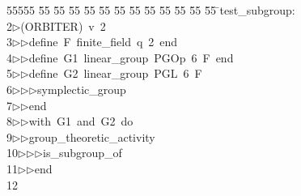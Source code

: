 %
%
\begin{tabbing}
55555 \= 55 \= 55 \= 55 \= 55 \= 55 \= 55 \= 55 \= 55 \= 55 \= 55 \= 55 \= 55 \= \>test\_subgroup:\\[0pt]
2\>$\triangleright$\>(ORBITER)\ v\ 2\ \\[0pt]
3\>$\triangleright$\>$\triangleright$\>define\ F\ finite\_field\ q\ 2\ end\ \\[0pt]
4\>$\triangleright$\>$\triangleright$\>define\ G1\ linear\_group\ PGOp\ 6\ F\ end\ \\[0pt]
5\>$\triangleright$\>$\triangleright$\>define\ G2\ linear\_group\ PGL\ 6\ F\ \\[0pt]
6\>$\triangleright$\>$\triangleright$\>$\triangleright$\>symplectic\_group\ \\[0pt]
7\>$\triangleright$\>$\triangleright$\>end\ \\[0pt]
8\>$\triangleright$\>$\triangleright$\>with\ G1\ and\ G2\ do\ \\[0pt]
9\>$\triangleright$\>$\triangleright$\>group\_theoretic\_activity\ \\[0pt]
10\>$\triangleright$\>$\triangleright$\>$\triangleright$\>is\_subgroup\_of\ \\[0pt]
11\>$\triangleright$\>$\triangleright$\>end\\[0pt]
12\>\end{tabbing}
